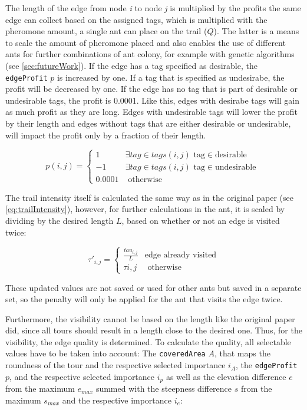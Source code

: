 The length of the edge from node \textit{i} to node \textit{j} is multiplied by the profits the same edge can collect based on the assigned tags, which is multiplied with the pheromone amount, a single ant can place on the trail ($Q$).
The latter is a means to scale the amount of pheromone placed and also enables the use of different ants for further combinations of ant colony, for example with genetic algorithms (see \ref{sec:futureWork}).
If the edge has a tag specified as desirable, the \texttt{edgeProfit} $p$ is increased by one.
If a tag that is specified as undesirabe, the profit will be decreased by one.
If the edge has no tag that is part of desirable or undesirable tags, the profit is 0.0001.
Like this, edges with desirabe tags will gain as much profit as they are long. 
Edges with undesirable tags will lower the profit by their length and edges without tags that are either desirable or undesirable, will impact the profit only by a fraction of their length.

\begin{equation}
	\label{eq:newProfitCalc}
	p(i,j) = \begin{cases}
		1 &\exists tag \in tags(i,j) \text{ tag} \in \text{desirable }\\
		-1 &\exists tag \in tags(i,j) \text{ tag} \in \text{undesirable }\\
		0.0001 &\text{ otherwise}
	\end{cases}
\end{equation}

The trail intensity itself is calculated the same way as in the original paper (see \ref{eq:trailIntensity}), however, for further calculations in the ant, it is scaled by dividing by the desired length $L$, based on whether or not an edge is visited twice:

\begin{equation}
	\label{eq:scaledTrailIntensity}
	\tau'_{i,j} = \begin{cases}
		 \frac{tau_{i,j}}{L} &\text{edge already visited}\\
		\tau{i,j} &\text{ otherwise}
	\end{cases}
\end{equation}

These updated values are not saved or used for other ants but saved in a separate set, so the penalty will only be applied for the ant that visits the edge twice.

Furthermore, the visibility cannot be based on the length like the original paper did, since all tours should result in a length close to the desired one.
Thus, for the visibility, the edge quality is determined.
To calculate the quality, all selectable values have to be taken into account:
The \texttt{coveredArea} $A$, that maps the roundness of the tour and the respective selected importance $i_A$, the \texttt{edgeProfit} $p$, and the respective selected importance $i_p$ as well as the elevation difference $e$ from the maximum $e_{max}$ summed with the steepness difference $s$ from the maximum $s_{max}$ and the respective importance $i_e$:

